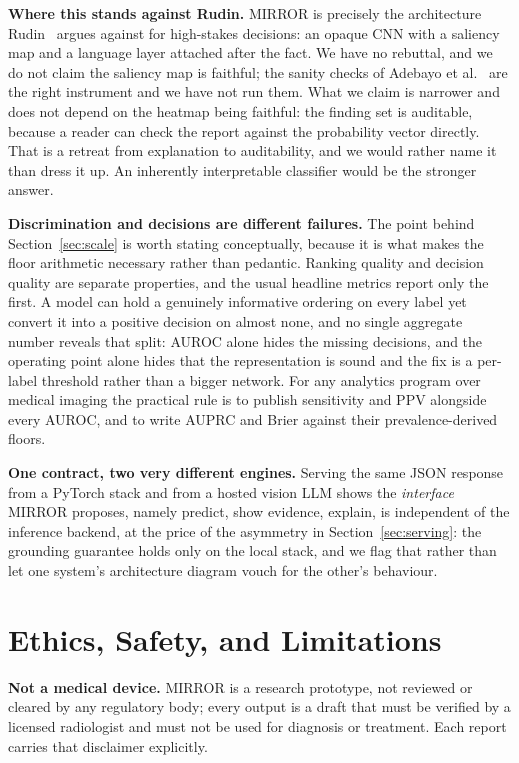 \documentclass[conference]{IEEEtran}
\newcommand{\rih}[1]{\textbf{#1}\enspace\ignorespaces}
\begin{document}
\rih{Where this stands against Rudin.} MIRROR is precisely the architecture
Rudin~\cite{rudin2019stop} argues against for high-stakes decisions: an opaque CNN
with a saliency map and a language layer attached after the fact. We have no
rebuttal, and we do not claim the saliency map is faithful; the sanity checks of
Adebayo et al.~\cite{adebayo2018sanity} are the right instrument and we have not run
them. What we claim is narrower and does not depend on the heatmap being faithful:
the finding set is auditable, because a reader can check the report against the
probability vector directly. That is a retreat from explanation to auditability, and
we would rather name it than dress it up. An inherently interpretable classifier
would be the stronger answer.

\rih{Discrimination and decisions are different failures.} The point behind
Section~\ref{sec:scale} is worth stating conceptually, because it is what makes the
floor arithmetic necessary rather than pedantic. Ranking quality and decision
quality are separate properties, and the usual headline metrics report only the
first. A model can hold a genuinely informative ordering on every label yet convert
it into a positive decision on almost none, and no single aggregate number reveals
that split: AUROC alone hides the missing decisions, and the operating point alone
hides that the representation is sound and the fix is a per-label threshold rather
than a bigger network. For any analytics program over medical imaging the practical
rule is to publish sensitivity and PPV alongside every AUROC, and to write AUPRC and
Brier against their prevalence-derived floors.

\rih{One contract, two very different engines.} Serving the same JSON response from
a PyTorch stack and from a hosted vision LLM shows the \emph{interface} MIRROR
proposes, namely predict, show evidence, explain, is independent of the inference
backend, at the price of the asymmetry in Section~\ref{sec:serving}: the grounding
guarantee holds only on the local stack, and we flag that rather than let one
system's architecture diagram vouch for the other's behaviour.

\section{Ethics, Safety, and Limitations}
\label{sec:ethics}

\rih{Not a medical device.} MIRROR is a research prototype, not reviewed or cleared
by any regulatory body; every output is a draft that must be verified by a licensed
radiologist and must not be used for diagnosis or treatment. Each report carries
that disclaimer explicitly.
\end{document}
